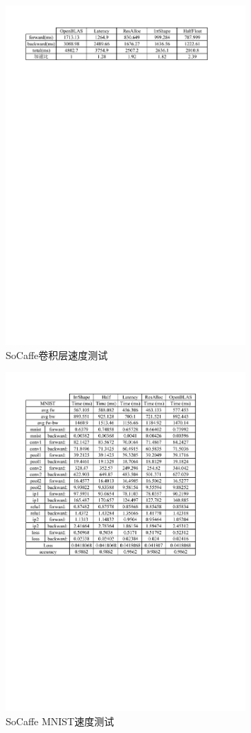 \documentclass[a4paper, 12pt]{article}
\begin{document}
\begin{figure}[!ht]
	\centering
	\includegraphics[width=0.8\textwidth]{assets/imgs/caffeconv}
	\caption{SoCaffe卷积层速度测试}
\end{figure}
\begin{figure}[!ht]
	\centering
	\includegraphics[width=0.8\textwidth]{assets/imgs/mnist}
	\caption{SoCaffe MNIST速度测试}
\end{figure}
\end{document}
